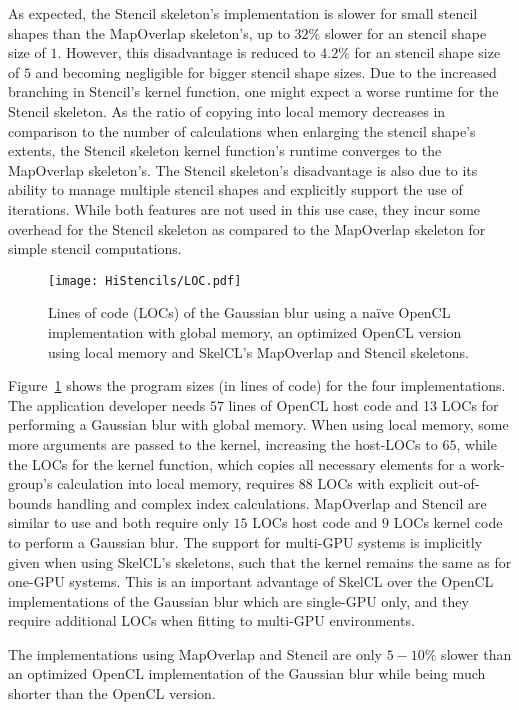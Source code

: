 As expected, the Stencil skeleton's implementation is slower for small stencil shapes than the MapOverlap skeleton's, up to $32\%$ slower for an stencil shape size of $1$. 
However, this disadvantage is reduced to $4.2\%$ for an stencil shape size of $5$ and becoming negligible for bigger stencil shape sizes.
Due to the increased branching in Stencil's kernel function, one might expect a worse runtime for the Stencil skeleton. 
As the ratio of copying into local memory decreases in comparison to the number of calculations when enlarging the stencil shape's extents, the Stencil skeleton kernel function's runtime converges to the MapOverlap skeleton's.
The Stencil skeleton's disadvantage is also due to its ability to manage multiple stencil shapes and explicitly support the use of iterations.
While both features are not used in this use case, they incur some overhead for the Stencil skeleton as compared to the MapOverlap skeleton for simple stencil computations.

\begin{figure}[tbp]
	\centering
	\texttt{[image: HiStencils/LOC.pdf]}
	\caption{Lines of code (LOCs) of the Gaussian blur using a na{\"i}ve OpenCL implementation with global memory, an optimized OpenCL version using local memory and SkelCL's MapOverlap and Stencil skeletons.}
	\label{fig:gaussLOCs}
\end{figure} 

Figure~\ref{fig:gaussLOCs} shows the program sizes (in lines of code) for the four implementations. 
The application developer needs $57$ lines of OpenCL host code and 13 LOCs for performing a Gaussian blur with global memory. 
When using local memory, some more arguments are passed to the kernel, increasing the host-LOCs to $65$, while the LOCs for the kernel function, which copies all necessary elements for a work-group's calculation into local memory, requires $88$ LOCs with explicit out-of-bounds handling and complex index calculations.
MapOverlap and Stencil are similar to use and both require only $15$ LOCs host code and $9$ LOCs kernel code to perform a Gaussian blur. 
The support for multi-GPU systems is implicitly given when using SkelCL's skeletons, such that the kernel remains the same as for one-GPU systems.
This is an important advantage of SkelCL over the OpenCL implementations of the Gaussian blur which are single-GPU only, and they require additional LOCs when fitting to multi-GPU environments.

The implementations using MapOverlap and Stencil are only $5-10\%$ slower than an optimized OpenCL implementation of the Gaussian blur while being much shorter than the OpenCL version.

